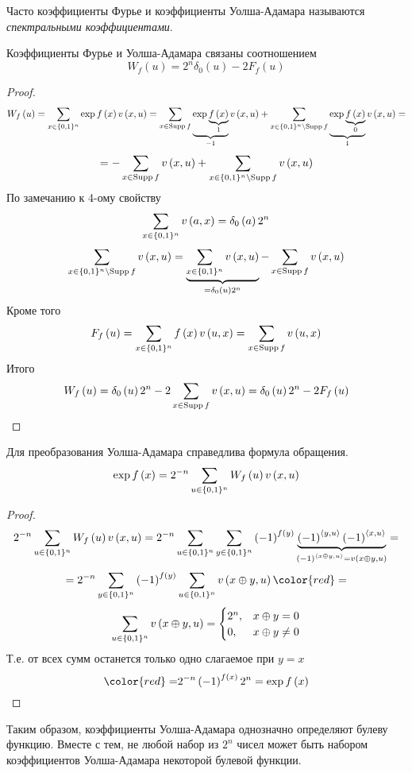 \begin{definition}
Часто коэффициенты Фурье и коэффициенты Уолша-Адамара называются \emph{спектральными
коэффициентами}.\end{definition}
\begin{theorem}
Коэффициенты Фурье и Уолша-Адамара связаны соотношением
\[
W_{f}\left(u\right)=2^{n}\delta_{0}\left(u\right)-2F_{f}\left(u\right)
\]
\end{theorem}
\begin{proof}
\[
W_{f}\left(u\right)=\sum_{x\in \{0,1\}^n}\exp f\left(x\right)v\left(x,u\right)=\sum_{x\in\operatorname*{Supp} f}\underbrace{\exp\underbrace{f\left(x\right)}_{1}}_{-1}v\left(x,u\right)+\sum_{x\in \{0,1\}^n\setminus\operatorname*{Supp} f}\underbrace{\exp\underbrace{f\left(x\right)}_{0}}_{1}v\left(x,u\right)=
\]
\[
=-\sum_{x\in\operatorname*{Supp} f}v\left(x,u\right)+\sum_{x\in \{0,1\}^n\setminus\operatorname*{Supp} f}v\left(x,u\right)
\]
По замечанию к 4-ому свойству 
\[
\sum_{x\in \{0,1\}^n}v\left(a,x\right)=\delta_{0}\left(a\right)2^{n}
\]
\[
\sum_{x\in \{0,1\}^n\setminus\operatorname*{Supp} f}v\left(x,u\right)=\underbrace{\sum_{x\in \{0,1\}^n}v\left(x,u\right)}_{=\delta_{0}\left(u\right)2^{n}}-\sum_{x\in\operatorname*{Supp} f}v\left(x,u\right)
\]
Кроме того
\[
F_{f}\left(u\right)=\sum_{x\in \{0,1\}^n}f\left(x\right)v\left(u,x\right)=\sum_{x\in\operatorname*{Supp} f}v\left(u,x\right)
\]
Итого
\[
W_{f}\left(u\right)=\delta_{0}\left(u\right)2^{n}-2\sum_{x\in\operatorname*{Supp} f}v\left(x,u\right)=\delta_{0}\left(u\right)2^{n}-2F_{f}\left(u\right)
\]
\end{proof}
\begin{theorem}
Для преобразования Уолша-Адамара справедлива формула обращения.
\[
\exp f\left(x\right)=2^{-n}\sum_{u\in \{0,1\}^n}W_{f}\left(u\right)v\left(x,u\right)
\]
\end{theorem}
\begin{proof}
\[
2^{-n}\sum_{u\in \{0,1\}^n}W_{f}\left(u\right)v\left(x,u\right)=2^{-n}\sum_{u\in \{0,1\}^n}\sum_{y\in \{0,1\}^n}\left(-1\right)^{f\left(y\right)}\underbrace{\left(-1\right)^{\left\langle y,u\right\rangle }\left(-1\right)^{\left\langle x,u\right\rangle }}_{\left(-1\right)^{\left\langle x\oplus y,u\right\rangle }=v\left(x\oplus y,u\right)}=
\]
\[
=2^{-n}\sum_{y\in \tw^n}\left(-1\right)^{f\left(y\right)}\sum_{u\in \tw^n}v\left(x\oplus y,u\right){\color{red}=}
\]
\[
\sum_{u\in \{0,1\}^n}v\left(x\oplus y,u\right)=\begin{cases}
2^{n}, & x\oplus y=0\\
0, & x\oplus y\not=0
\end{cases}
\]
Т.е. от всех сумм останется только одно слагаемое при $y=x$
\[
{\color{red}=}2^{-n}\left(-1\right)^{f\left(x\right)}2^{n}=\exp f\left(x\right)
\]

\end{proof}
Таким образом, коэффициенты Уолша-Адамара однозначно определяют булеву
функцию. Вместе с тем, не любой набор из $2^{n}$ чисел может быть
набором коэффициентов Уолша-Адамара некоторой булевой функции. 

